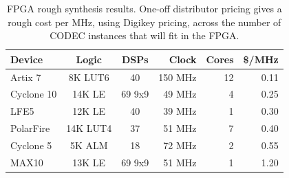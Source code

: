 \begin{table}[t]\centering
	\label{tab:FPGAfit}
	\caption{FPGA rough synthesis results. One-off distributor pricing gives a
	rough cost per MHz, using Digikey pricing, across the number of CODEC
	instances that will fit in the FPGA.}
	\centering
	\begin{tabular}{lccrrr}
		\hline\hline
		Device & Logic & DSPs & Clock & Cores & \$/MHz\\ [0.5ex]
		\hline
        Artix 7   & 8K LUT6 & 40   & 150 MHz & 12 & 0.11\\
		Cyclone 10& 14K LE & 69 9x9 & 49 MHz &  4 & 0.25\\
		LFE5      & 12K LE & 40     & 39 MHz &  1 & 0.30\\
        PolarFire & 14K LUT4 & 37   & 51 MHz &  7 & 0.40\\
		Cyclone 5 & 5K ALM & 18     & 72 MHz &  2 & 0.55\\
		MAX10     & 13K LE & 69 9x9 & 51 MHz &  1 & 1.20\\
		\hline
	\end{tabular}
\end{table}

